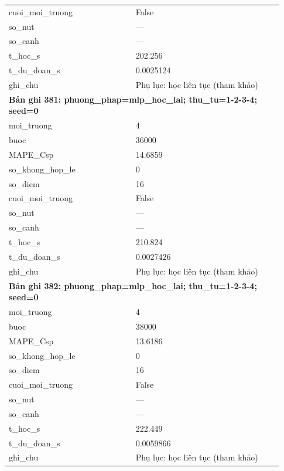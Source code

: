 \begin{longtable}{p{0.43\linewidth}p{0.50\linewidth}}
cuoi\_\allowbreak moi\_\allowbreak truong & False \\
so\_\allowbreak nut & — \\
so\_\allowbreak canh & — \\
t\_\allowbreak hoc\_\allowbreak s & 202.256 \\
t\_\allowbreak du\_\allowbreak doan\_\allowbreak s & 0.0025124 \\
ghi\_\allowbreak chu & Phụ lục: học liên tục (tham khảo) \\
\midrule
\multicolumn{2}{p{0.95\linewidth}}{\textbf{Bản ghi 381: phuong\_phap=mlp\_hoc\_lai; thu\_tu=1-2-3-4; seed=0}} \\
moi\_\allowbreak truong & 4 \\
buoc & 36000 \\
MAPE\_\allowbreak Csp & 14.6859 \\
so\_\allowbreak khong\_\allowbreak hop\_\allowbreak le & 0 \\
so\_\allowbreak diem & 16 \\
cuoi\_\allowbreak moi\_\allowbreak truong & False \\
so\_\allowbreak nut & — \\
so\_\allowbreak canh & — \\
t\_\allowbreak hoc\_\allowbreak s & 210.824 \\
t\_\allowbreak du\_\allowbreak doan\_\allowbreak s & 0.0027426 \\
ghi\_\allowbreak chu & Phụ lục: học liên tục (tham khảo) \\
\midrule
\multicolumn{2}{p{0.95\linewidth}}{\textbf{Bản ghi 382: phuong\_phap=mlp\_hoc\_lai; thu\_tu=1-2-3-4; seed=0}} \\
moi\_\allowbreak truong & 4 \\
buoc & 38000 \\
MAPE\_\allowbreak Csp & 13.6186 \\
so\_\allowbreak khong\_\allowbreak hop\_\allowbreak le & 0 \\
so\_\allowbreak diem & 16 \\
cuoi\_\allowbreak moi\_\allowbreak truong & False \\
so\_\allowbreak nut & — \\
so\_\allowbreak canh & — \\
t\_\allowbreak hoc\_\allowbreak s & 222.449 \\
t\_\allowbreak du\_\allowbreak doan\_\allowbreak s & 0.0059866 \\
ghi\_\allowbreak chu & Phụ lục: học liên tục (tham khảo) \\

\end{longtable}
